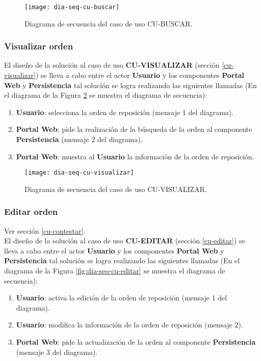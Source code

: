 \begin{figure}[h]
	\centering
	\texttt{[image: dia-seq-cu-buscar]}
	\caption{Diagrama de secuencia del caso de uso CU-BUSCAR.}
	\label{fig:dia-seq-cu-buscar}
\end{figure}

\subsubsection{Visualizar orden}
El diseño de la solución al caso de uso \textbf{CU-VISUALIZAR} (sección \ref{cu-visualizar}) se lleva a cabo entre el actor \textbf{Usuario} y los componentes \textbf{Portal Web} y \textbf{Persistencia} tal solución se logra realizando las siguientes llamadas (En el diagrama de la Figura \ref{fig:dia-seq-cu-visualizar} se muestra el diagrama de secuencia):
\begin{enumerate}
	\item \textbf{Usuario}: selecciona la orden de reposición (mensaje 1 del diagrama).
	\item \textbf{Portal Web}: pide la realización de la búsqueda de la orden al componente \textbf{Persistencia} (mensaje 2 del diagrama).
	\item \textbf{Portal Web}: muestra al \textbf{Usuario} la información de la orden de reposición.
\end{enumerate}

\begin{figure}[h]
	\centering
	\texttt{[image: dia-seq-cu-visualizar]}
	\caption{Diagrama de secuencia del caso de uso CU-VISUALIZAR.}
	\label{fig:dia-seq-cu-visualizar}
\end{figure}

\subsubsection{Editar orden}
Ver sección \ref{cu-contestar}.\\
El diseño de la solución al caso de uso \textbf{CU-EDITAR} (sección \ref{cu-editar}) se lleva a cabo entre el actor \textbf{Usuario} y los componentes \textbf{Portal Web} y \textbf{Persistencia} tal solución se logra realizando las siguientes llamadas (En el diagrama de la Figura \ref{fig:dia-seq-cu-editar} se muestra el diagrama de secuencia):
\begin{enumerate}
	\item \textbf{Usuario}: activa la edición de la orden de reposición (mensaje 1 del diagrama).
	\item \textbf{Usuario}: modifica la información de la orden de reposición (mensaje 2).
	\item \textbf{Portal Web}: pide la actualización de la orden al componente \textbf{Persistencia} (mensaje 3 del diagrama).
\end{enumerate}

